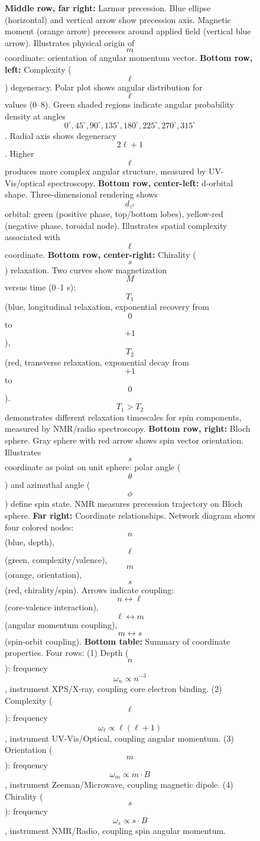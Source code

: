 \begin{figure}[htbp]
{                      \textbf{Middle row, far right:} Larmor precession. Blue ellipse (horizontal) and vertical arrow show precession axis. Magnetic moment (orange arrow) precesses around applied field (vertical blue arrow). Illustrates physical origin of $$m$$ coordinate: orientation of angular momentum vector. 
                      \textbf{Bottom row, left:} Complexity ($$\ell$$) degeneracy. Polar plot shows angular distribution for $$\ell$$ values (0--8). Green shaded regions indicate angular probability density at angles $$0^\circ, 45^\circ, 90^\circ, 135^\circ, 180^\circ, 225^\circ, 270^\circ, 315^\circ$$. Radial axis shows degeneracy $$2\ell+1$$. Higher $$\ell$$ produces more complex angular structure, measured by UV-Vis/optical spectroscopy. 
                      \textbf{Bottom row, center-left:} d-orbital shape. Three-dimensional rendering shows $$d_{z^2}$$ orbital: green (positive phase, top/bottom lobes), yellow-red (negative phase, toroidal node). Illustrates spatial complexity associated with $$\ell$$ coordinate. 
                      \textbf{Bottom row, center-right:} Chirality ($$s$$) relaxation. Two curves show magnetization $$M$$ versus time (0--1 s): $$T_1$$ (blue, longitudinal relaxation, exponential recovery from $$0$$ to $$+1$$), $$T_2$$ (red, transverse relaxation, exponential decay from $$+1$$ to $$0$$). $$T_1 > T_2$$ demonstrates different relaxation timescales for spin components, measured by NMR/radio spectroscopy. 
                      \textbf{Bottom row, right:} Bloch sphere. Gray sphere with red arrow shows spin vector orientation. Illustrates $$s$$ coordinate as point on unit sphere: polar angle ($$\theta$$) and azimuthal angle ($$\phi$$) define spin state. NMR measures precession trajectory on Bloch sphere. 
                      \textbf{Far right:} Coordinate relationships. Network diagram shows four colored nodes: $$n$$ (blue, depth), $$\ell$$ (green, complexity/valence), $$m$$ (orange, orientation), $$s$$ (red, chirality/spin). Arrows indicate coupling: $$n \leftrightarrow \ell$$ (core-valence interaction), $$\ell \leftrightarrow m$$ (angular momentum coupling), $$m \leftrightarrow s$$ (spin-orbit coupling). 
                      \textbf{Bottom table:} Summary of coordinate properties. Four rows: (1) Depth ($$n$$): frequency $$\omega_n \propto n^{-3}$$, instrument XPS/X-ray, coupling core electron binding. (2) Complexity ($$\ell$$): frequency $$\omega_\ell \propto \ell(\ell+1)$$, instrument UV-Vis/Optical, coupling angular momentum. (3) Orientation ($$m$$): frequency $$\omega_m \propto m \cdot B$$, instrument Zeeman/Microwave, coupling magnetic dipole. (4) Chirality ($$s$$): frequency $$\omega_s \propto s \cdot B$$, instrument NMR/Radio, coupling spin angular momentum.}
                      \label{fig:unified_spectroscopy}
                      \end{figure}
  
